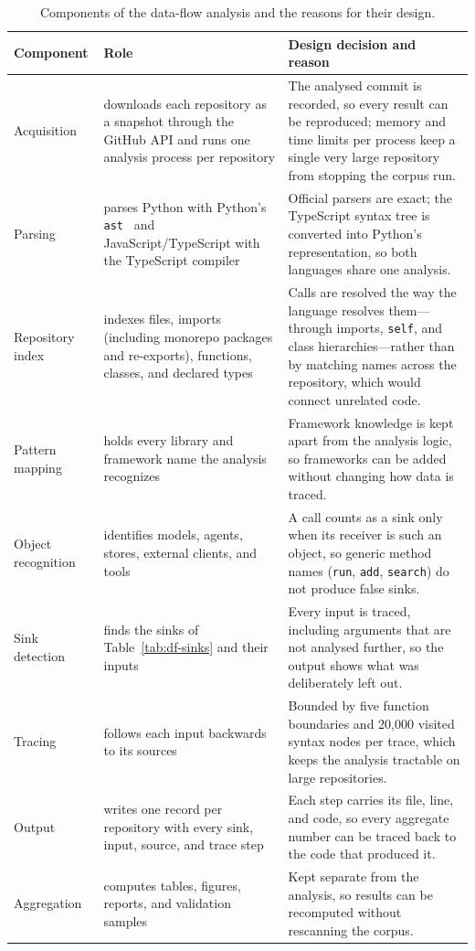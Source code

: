\begin{table}[t]
\centering
\footnotesize
\renewcommand{\arraystretch}{1.2}
\setlength{\tabcolsep}{4pt}
\caption{Components of the data-flow analysis and the reasons for their design.}
\label{tab:df-architecture}
\begin{tabular}{@{}>{\raggedright\arraybackslash}p{}>{\raggedright\arraybackslash}p{}>{\raggedright\arraybackslash}p{}@{}}
\toprule
\textbf{Component} & \textbf{Role} & \textbf{Design decision and reason} \\
\midrule
Acquisition & downloads each repository as a snapshot through the GitHub API and runs one analysis process per repository & The analysed commit is recorded, so every result can be reproduced; memory and time limits per process keep a single very large repository from stopping the corpus run. \\
Parsing & parses Python with Python's \texttt{ast}~\cite{python-ast} and JavaScript/TypeScript with the TypeScript compiler~\cite{typescript} & Official parsers are exact; the TypeScript syntax tree is converted into Python's representation, so both languages share one analysis. \\
Repository index & indexes files, imports (including monorepo packages and re-exports), functions, classes, and declared types & Calls are resolved the way the language resolves them---through imports, \texttt{self}, and class hierarchies---rather than by matching names across the repository, which would connect unrelated code. \\
Pattern mapping & holds every library and framework name the analysis recognizes & Framework knowledge is kept apart from the analysis logic, so frameworks can be added without changing how data is traced. \\
Object recognition & identifies models, agents, stores, external clients, and tools & A call counts as a sink only when its receiver is such an object, so generic method names (\texttt{run}, \texttt{add}, \texttt{search}) do not produce false sinks. \\
Sink detection & finds the sinks of Table~\ref{tab:df-sinks} and their inputs & Every input is traced, including arguments that are not analysed further, so the output shows what was deliberately left out. \\
Tracing & follows each input backwards to its sources & Bounded by five function boundaries and 20{,}000 visited syntax nodes per trace, which keeps the analysis tractable on large repositories. \\
Output & writes one record per repository with every sink, input, source, and trace step & Each step carries its file, line, and code, so every aggregate number can be traced back to the code that produced it. \\
Aggregation & computes tables, figures, reports, and validation samples & Kept separate from the analysis, so results can be recomputed without rescanning the corpus. \\
\bottomrule
\end{tabular}
\end{table}

